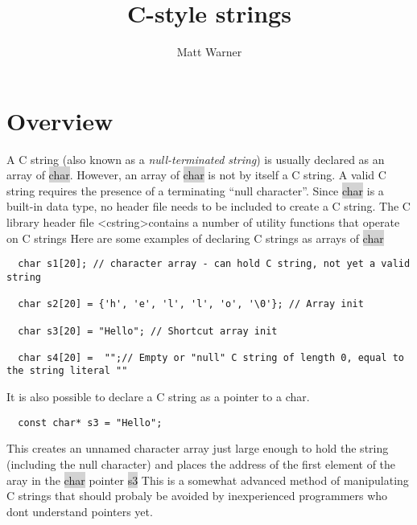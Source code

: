 \documentclass{report}
\title{\Huge{C-style strings}}
\author{\huge{Matt Warner}}
\date{\huge{}}
\begin{document}
  \maketitle
  \section{Overview}
  A C string (also known as a \textit{null-terminated string}) is usually declared as an array of \colorbox{lightgray}{char}. However, an array of \colorbox{lightgray}{char} is not by itself a C string.
  \bigbreak \noindent
  A valid C string requires the presence of a terminating ``null character''.
  \bigbreak \noindent
  Since \colorbox{lightgray}{char} is a built-in data type, no header file needs to be included to create a C string. The C library header file \textless cstring\textgreater contains a number of utility functions that operate on C strings
  \bigbreak \noindent
  Here are some examples of declaring C strings as arrays of \colorbox{lightgray}{char}
  \begin{mdframed}
  \begin{verbatim}
  char s1[20]; // character array - can hold C string, not yet a valid string
   
  char s2[20] = {'h', 'e', 'l', 'l', 'o', '\0'}; // Array init

  char s3[20] = "Hello"; // Shortcut array init

  char s4[20] =  "";// Empty or "null" C string of length 0, equal to the string literal "" 
  \end{verbatim}
  \end{mdframed}
  \bigbreak \noindent
  It is also possible to declare a C string as a pointer to a char.
  \begin{mdframed}
  \begin{verbatim}
  const char* s3 = "Hello";
  \end{verbatim}
  \end{mdframed}
  \bigbreak \noindent
  This creates an unnamed character array just large enough to hold the string (including the null character) and places the address of the first element of the aray in the \colorbox{lightgray}{char} pointer \colorbox{lightgray}{s3}
  \bigbreak \noindent
  This is a somewhat advanced method of manipulating C strings that should probaly be avoided by inexperienced programmers who dont understand pointers yet.
\end{document}
